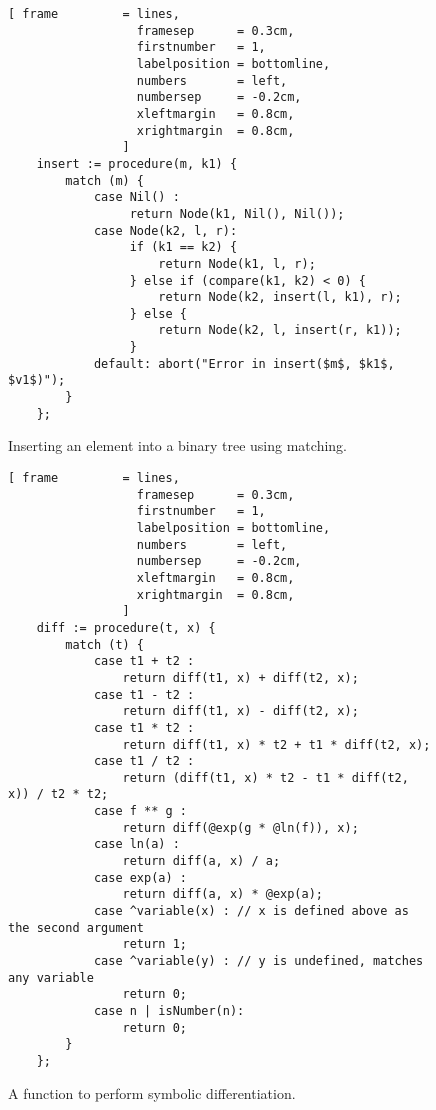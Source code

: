 \begin{figure}[!ht]
\centering
\begin{Verbatim}[ frame         = lines, 
                  framesep      = 0.3cm, 
                  firstnumber   = 1,
                  labelposition = bottomline,
                  numbers       = left,
                  numbersep     = -0.2cm,
                  xleftmargin   = 0.8cm,
                  xrightmargin  = 0.8cm,
                ]
    insert := procedure(m, k1) {
        match (m) {
            case Nil() : 
                 return Node(k1, Nil(), Nil());
            case Node(k2, l, r): 
                 if (k1 == k2) {
                     return Node(k1, l, r);
                 } else if (compare(k1, k2) < 0) { 
                     return Node(k2, insert(l, k1), r);
                 } else {
                     return Node(k2, l, insert(r, k1));
                 }
            default: abort("Error in insert($m$, $k1$, $v1$)");
        }
    };
\end{Verbatim}
\vspace*{-0.3cm}
\caption{Inserting an element into a binary tree using matching.}
\label{fig:binary-tree.stlx}
\end{figure}

\begin{figure}[!ht]
\centering
\begin{Verbatim}[ frame         = lines, 
                  framesep      = 0.3cm, 
                  firstnumber   = 1,
                  labelposition = bottomline,
                  numbers       = left,
                  numbersep     = -0.2cm,
                  xleftmargin   = 0.8cm,
                  xrightmargin  = 0.8cm,
                ]
    diff := procedure(t, x) {
        match (t) {
            case t1 + t2 :
                return diff(t1, x) + diff(t2, x);
            case t1 - t2 :
                return diff(t1, x) - diff(t2, x);
            case t1 * t2 :
                return diff(t1, x) * t2 + t1 * diff(t2, x);
            case t1 / t2 :
                return (diff(t1, x) * t2 - t1 * diff(t2, x)) / t2 * t2;
            case f ** g :
                return diff(@exp(g * @ln(f)), x);
            case ln(a) :
                return diff(a, x) / a;
            case exp(a) :
                return diff(a, x) * @exp(a);
            case ^variable(x) : // x is defined above as the second argument
                return 1;
            case ^variable(y) : // y is undefined, matches any variable
                return 0;
            case n | isNumber(n):   
                return 0;  
        }
    };
\end{Verbatim}
\vspace*{-0.3cm}
\caption{A function to perform symbolic differentiation.}
\label{fig:diff.stlx}
\end{figure}


